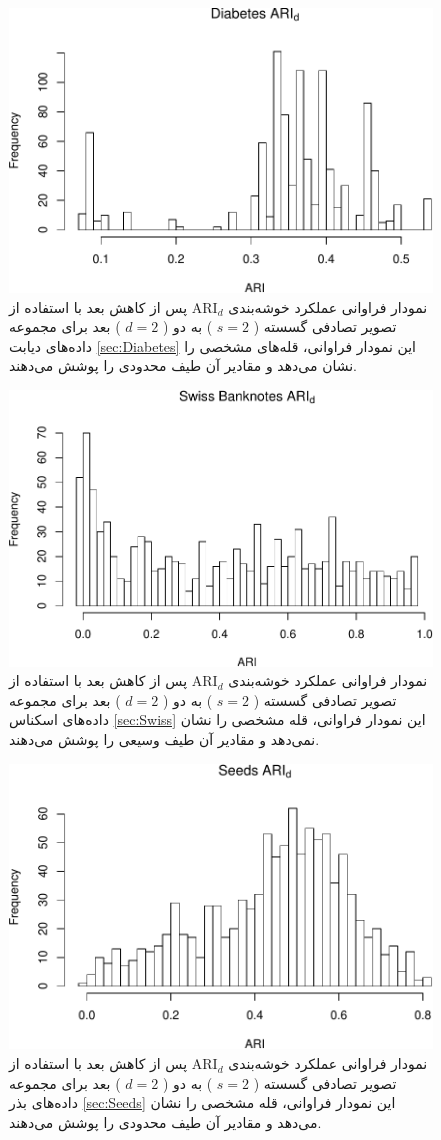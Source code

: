 \begin{figure}[H]
\centering
\includegraphics[width=0.7\linewidth]{Report_files/figure-latex/unnamed-chunk-15-3}
\caption{
نمودار فراوانی عملکرد خوشه‌بندی 
$\mathrm{ARI}_d$
پس از کاهش بعد با استفاده از تصویر تصادفی
گسسته (%
$s=2$%
)
به دو (%
$d=2$%
)
بعد برای مجموعه داده‌های
دیابت
\ref{sec:Diabetes}
این نمودار فراوانی،
قله‌های
مشخصی را نشان 
می‌دهد
و مقادیر آن طیف 
محدودی
 را پوشش می‌دهند.
}
\end{figure}

\begin{figure}[H]
\centering
\includegraphics[width=0.7\linewidth]{Report_files/figure-latex/unnamed-chunk-15-4}
\caption{
نمودار فراوانی عملکرد خوشه‌بندی 
$\mathrm{ARI}_d$
پس از کاهش بعد با استفاده از تصویر تصادفی
گسسته (%
$s=2$%
)
به دو (%
$d=2$%
)
بعد برای مجموعه داده‌های
اسکناس
\ref{sec:Swiss}
این نمودار فراوانی،
قله
مشخصی را نشان 
نمی‌دهد
و مقادیر آن طیف 
وسیعی را پوشش می‌دهند.
}
\end{figure}

\begin{figure}[H]
\centering
\includegraphics[width=0.7\linewidth]{Report_files/figure-latex/unnamed-chunk-15-5}
\caption{
نمودار فراوانی عملکرد خوشه‌بندی 
$\mathrm{ARI}_d$
پس از کاهش بعد با استفاده از تصویر تصادفی
گسسته (%
$s=2$%
)
به دو (%
$d=2$%
)
بعد برای مجموعه داده‌های
بذر
\ref{sec:Seeds}
این نمودار فراوانی،
قله
مشخصی را نشان 
می‌دهد
و مقادیر آن طیف 
محدودی
 را پوشش می‌دهند.
}
\end{figure}


